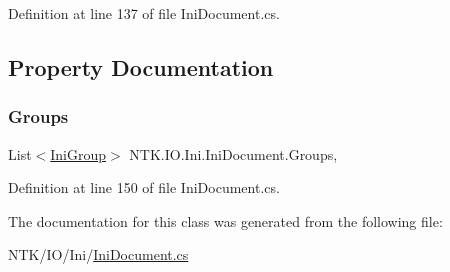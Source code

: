 Definition at line 137 of file Ini\+Document.\+cs.



\subsection{Property Documentation}
\mbox{\label{class_n_t_k_1_1_i_o_1_1_ini_1_1_ini_document_afa8116b6c65c3036c45ecf8a70e18a75}} 
\subsubsection{\texorpdfstring{Groups}{Groups}}
{\footnotesize\ttfamily List$<$\mbox{\hyperlink{class_n_t_k_1_1_i_o_1_1_ini_1_1_ini_group}{Ini\+Group}}$>$ N\+T\+K.\+I\+O.\+Ini.\+Ini\+Document.\+Groups\hspace{0.3cm}{\ttfamily [get]}, {\ttfamily [set]}}







Definition at line 150 of file Ini\+Document.\+cs.



The documentation for this class was generated from the following file\+:\begin{DoxyCompactItemize}
\item 
N\+T\+K/\+I\+O/\+Ini/\mbox{\hyperlink{_ini_document_8cs}{Ini\+Document.\+cs}}\end{DoxyCompactItemize}
